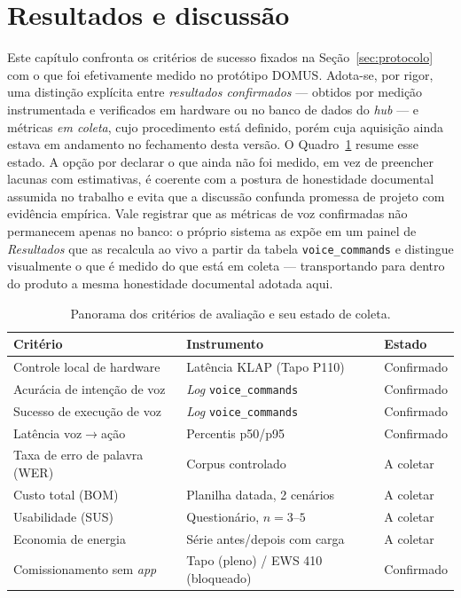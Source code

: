 \section{Resultados e discussão}\label{cap:resultados}

Este capítulo confronta os critérios de sucesso fixados na Seção~\ref{sec:protocolo}
com o que foi efetivamente medido no protótipo DOMUS. Adota-se, por rigor, uma
distinção explícita entre \textit{resultados confirmados} --- obtidos por medição
instrumentada e verificados em hardware ou no banco de dados do \textit{hub} --- e
métricas \textit{em coleta}, cujo procedimento está definido, porém cuja aquisição
ainda estava em andamento no fechamento desta versão. O Quadro~\ref{tab:panorama}
resume esse estado. A opção por declarar o que ainda não foi medido, em vez de
preencher lacunas com estimativas, é coerente com a postura de honestidade documental
assumida no trabalho e evita que a discussão confunda promessa de projeto com
evidência empírica. Vale registrar que as métricas de voz confirmadas não permanecem
apenas no banco: o próprio sistema as expõe em um painel de \textit{Resultados} que as
recalcula ao vivo a partir da tabela \texttt{voice\_commands} e distingue visualmente o
que é medido do que está em coleta --- transportando para dentro do produto a mesma
honestidade documental adotada aqui.

\begin{table}[H]
\centering
\caption{Panorama dos critérios de avaliação e seu estado de coleta.}
\label{tab:panorama}
\begin{tabular}{@{}lll@{}}
\toprule
\textbf{Critério} & \textbf{Instrumento} & \textbf{Estado} \\
\midrule
Controle local de hardware   & Latência KLAP (Tapo P110)        & Confirmado \\
Acurácia de intenção de voz  & \textit{Log} \texttt{voice\_commands} & Confirmado \\
Sucesso de execução de voz   & \textit{Log} \texttt{voice\_commands} & Confirmado \\
Latência voz$\rightarrow$ação & Percentis p50/p95                & Confirmado \\
Taxa de erro de palavra (WER) & Corpus controlado                & A coletar  \\
Custo total (BOM)            & Planilha datada, 2 cenários      & A coletar  \\
Usabilidade (SUS)            & Questionário, $n=3$--$5$         & A coletar  \\
Economia de energia          & Série antes/depois com carga     & A coletar  \\
Comissionamento sem \textit{app} & Tapo (pleno) / EWS 410 (bloqueado) & Confirmado \\
\bottomrule
\end{tabular}
\end{table}

